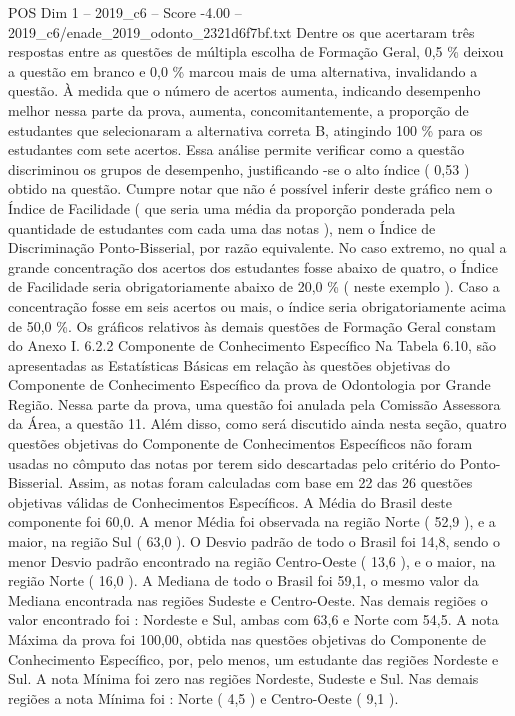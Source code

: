 \begin{textsample}{POS Dim 1 – 2019\_c6 – Score -4.00 – 2019\_c6/enade\_2019\_odonto\_2321d6f7bf.txt}
Dentre os que acertaram três respostas entre as questões de múltipla escolha de Formação Geral, 0,5 \% deixou a questão em branco e 0,0 \% marcou mais de uma alternativa, invalidando a questão.
À medida que o número de acertos aumenta, indicando desempenho melhor nessa parte da prova, aumenta, concomitantemente, a proporção de estudantes que selecionaram a alternativa correta B, atingindo 100 \% para os estudantes com sete acertos.
Essa análise permite verificar como a questão discriminou os grupos de desempenho, justificando -se o alto índice ( 0,53 ) obtido na questão.
Cumpre notar que não é possível inferir deste gráfico nem o Índice de Facilidade ( que seria uma média da proporção ponderada pela quantidade de estudantes com cada uma das notas ), nem o Índice de Discriminação Ponto-Bisserial, por razão equivalente.
No caso extremo, no qual a grande concentração dos acertos dos estudantes fosse abaixo de quatro, o Índice de Facilidade seria obrigatoriamente abaixo de 20,0 \% ( neste exemplo ).
Caso a concentração fosse em seis acertos ou mais, o índice seria obrigatoriamente acima de 50,0 \%.
Os gráficos relativos às demais questões de Formação Geral constam do Anexo I. 6.2.2 Componente de Conhecimento Específico Na Tabela 6.10, são apresentadas as Estatísticas Básicas em relação às questões objetivas do Componente de Conhecimento Específico da prova de Odontologia por Grande Região.
Nessa parte da prova, uma questão foi anulada pela Comissão Assessora da Área, a questão 11.
Além disso, como será discutido ainda nesta seção, quatro questões objetivas do Componente de Conhecimentos Específicos não foram usadas no cômputo das notas por terem sido descartadas pelo critério do Ponto-Bisserial.
Assim, as notas foram calculadas com base em 22 das 26 questões objetivas válidas de Conhecimentos Específicos.
A Média do Brasil deste componente foi 60,0.
A menor Média foi observada na região Norte ( 52,9 ), e a maior, na região Sul ( 63,0 ).
O Desvio padrão de todo o Brasil foi 14,8, sendo o menor Desvio padrão encontrado na região Centro-Oeste ( 13,6 ), e o maior, na região Norte ( 16,0 ).
A Mediana de todo o Brasil foi 59,1, o mesmo valor da Mediana encontrada nas regiões Sudeste e Centro-Oeste.
Nas demais regiões o valor encontrado foi : Nordeste e Sul, ambas com 63,6 e Norte com 54,5.
A nota Máxima da prova foi 100,00, obtida nas questões objetivas do Componente de Conhecimento Específico, por, pelo menos, um estudante das regiões Nordeste e Sul.
A nota Mínima foi zero nas regiões Nordeste, Sudeste e Sul.
Nas demais regiões a nota Mínima foi : Norte ( 4,5 ) e Centro-Oeste ( 9,1 ).

\end{textsample}

